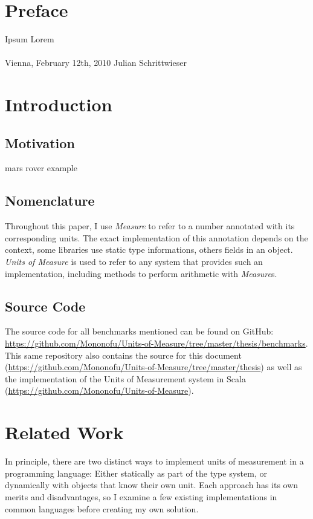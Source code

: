 \documentclass[12pt,oneside,a4paper]{scrbook}
\theoremstyle{definition}
\begin{document}
\chapter*{Preface}

Ipsum Lorem
\\ \\
Vienna, February 12th, 2010  \hfill Julian Schrittwieser

\singlespacing
\tableofcontents

\chapter{Introduction}
\setcounter{page}{1}

\section{Motivation}
mars rover example

\section{Nomenclature}
Throughout this paper, I use \emph{Measure} to refer to a number annotated with its corresponding units. The exact implementation of this annotation depends on the context, some libraries use static type informations, others fields in an object. \emph{Units of Measure} is used to refer to any system that provides such an implementation, including methods to perform arithmetic with \emph{Measure}s.

\section{Source Code}
The source code for all benchmarks mentioned can be found on GitHub: \url{https://github.com/Mononofu/Units-of-Measure/tree/master/thesis/benchmarks}. This same repository also contains the source for this document (\url{https://github.com/Mononofu/Units-of-Measure/tree/master/thesis}) as well as the implementation of the Units of Measurement system in Scala (\url{https://github.com/Mononofu/Units-of-Measure}).

\chapter{Related Work}

In principle, there are two distinct ways to implement units of measurement in a programming language: Either statically as part of the type system, or dynamically with objects that know their own unit. Each approach has its own merits and disadvantages, so I examine a few existing implementations in common languages before creating my own solution.
\end{document}
